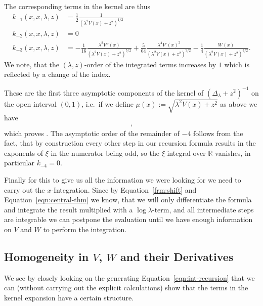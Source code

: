 The corresponding terms in the kernel are thus
\begin{align*}
  k_{-1}(x,x,\lambda,z) &= \frac{1}{2} \frac{1}{(\lambda^2 V(x) + z^2)^{1/2}} \\
  k_{-2}(x,x,\lambda,z) &= 0 \\
  k_{-3}(x,x,\lambda,z) &= - \frac{1}{16} \frac{\lambda^2 V''(x)}{(\lambda^2
    V(x) + z^2)^{5/2}} + \frac{5}{64} \frac{\lambda^4 V'(x)^2}{(\lambda^2V(x)
    + z^2)^{7/2}} -\frac{1}{4}\frac{W(x)}{(\lambda^2 V(x) + z^2)^{3/2}}.
  \label{eqn:coeff-kernel}
\end{align*}
We note, that the $(\lambda,z)$-order of the integrated terms increases by $1$
which is reflected by a change of the index.

These are the first three asymptotic components of the kernel of
$(\Delta_\lambda + z^2)^{-1}$ on the open interval $(0,1)$, i.e.\ if we define
$\mu(x) := \sqrt{\lambda^2 V(x) + z^2}$ as above we have
\begin{align*}
  ,
\end{align*}
which proves . The asymptotic order of the remainder of
$-4$ follows from the fact, that by construction every other step in our
recursion formula results in the exponents of $\xi$ in the numerator being odd,
so the $\xi$ integral over $\mathbb{R}$ vanishes, in particular $k_{-4} =
0$.

Finally for this to give us all the information we were looking for we need to
carry out the $x$-Integration. Since by Equation~\eqref{frm:shift} and
Equation~\eqref{eqn:central-thm} we know, that we will only differentiate the
formula and integrate the result multiplied with a $\log\lambda$-term, and all
intermediate steps are integrable we can postpone the evaluation until we have
enough information on $V$ and $W$ to perform the integration.

\subsection{Homogeneity in $V$, $W$ and their Derivatives}
We see by closely looking on the generating Equation~\eqref{eqn:int-recursion}
that we can (without carrying out the explicit calculations) show that the terms
in the kernel expansion have a certain structure.

